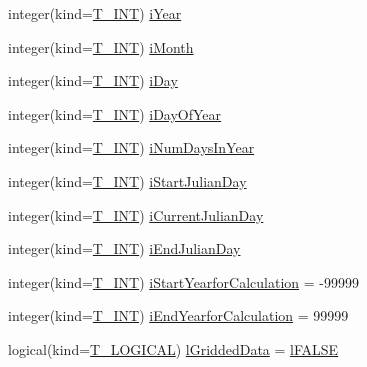 \begin{DoxyCompactItemize}
\item 
integer(kind=\hyperlink{namespacetest_a6f91ebd89b58cfcc5da99faed9385c1e}{T\_\-INT}) \hyperlink{typetest_1_1_t___m_o_d_e_l___c_o_n_f_i_g_u_r_a_t_i_o_n_a30420c6d7bb1e42891b2200260801f9c}{iYear}
\item 
integer(kind=\hyperlink{namespacetest_a6f91ebd89b58cfcc5da99faed9385c1e}{T\_\-INT}) \hyperlink{typetest_1_1_t___m_o_d_e_l___c_o_n_f_i_g_u_r_a_t_i_o_n_a22846dd71b4bccd8a1c00043437ac3f2}{iMonth}
\item 
integer(kind=\hyperlink{namespacetest_a6f91ebd89b58cfcc5da99faed9385c1e}{T\_\-INT}) \hyperlink{typetest_1_1_t___m_o_d_e_l___c_o_n_f_i_g_u_r_a_t_i_o_n_acbaa378dccabd89a4d13129e2c548146}{iDay}
\item 
integer(kind=\hyperlink{namespacetest_a6f91ebd89b58cfcc5da99faed9385c1e}{T\_\-INT}) \hyperlink{typetest_1_1_t___m_o_d_e_l___c_o_n_f_i_g_u_r_a_t_i_o_n_a4b04b0f7e7a10db7c8d28cea2b6e9848}{iDayOfYear}
\item 
integer(kind=\hyperlink{namespacetest_a6f91ebd89b58cfcc5da99faed9385c1e}{T\_\-INT}) \hyperlink{typetest_1_1_t___m_o_d_e_l___c_o_n_f_i_g_u_r_a_t_i_o_n_aab5b98a166cd8c8d894db495d6a58b16}{iNumDaysInYear}
\item 
integer(kind=\hyperlink{namespacetest_a6f91ebd89b58cfcc5da99faed9385c1e}{T\_\-INT}) \hyperlink{typetest_1_1_t___m_o_d_e_l___c_o_n_f_i_g_u_r_a_t_i_o_n_ae7c0e66b9ae35864c3ecaf8daf437d31}{iStartJulianDay}
\item 
integer(kind=\hyperlink{namespacetest_a6f91ebd89b58cfcc5da99faed9385c1e}{T\_\-INT}) \hyperlink{typetest_1_1_t___m_o_d_e_l___c_o_n_f_i_g_u_r_a_t_i_o_n_a0d100f6b26ab499a54097cca3828f266}{iCurrentJulianDay}
\item 
integer(kind=\hyperlink{namespacetest_a6f91ebd89b58cfcc5da99faed9385c1e}{T\_\-INT}) \hyperlink{typetest_1_1_t___m_o_d_e_l___c_o_n_f_i_g_u_r_a_t_i_o_n_a505c58e377653d1063a50f56fc081fff}{iEndJulianDay}
\item 
integer(kind=\hyperlink{namespacetest_a6f91ebd89b58cfcc5da99faed9385c1e}{T\_\-INT}) \hyperlink{typetest_1_1_t___m_o_d_e_l___c_o_n_f_i_g_u_r_a_t_i_o_n_ac4f0134042449fa35fc01ddc10403b57}{iStartYearforCalculation} = -\/99999
\item 
integer(kind=\hyperlink{namespacetest_a6f91ebd89b58cfcc5da99faed9385c1e}{T\_\-INT}) \hyperlink{typetest_1_1_t___m_o_d_e_l___c_o_n_f_i_g_u_r_a_t_i_o_n_ab0bc33153f6bf665d6444258b59340c6}{iEndYearforCalculation} = 99999
\item 
logical(kind=\hyperlink{namespacetest_acdeac586276a7d1d394fb5eddc77fc3d}{T\_\-LOGICAL}) \hyperlink{typetest_1_1_t___m_o_d_e_l___c_o_n_f_i_g_u_r_a_t_i_o_n_aac451f732bf0ba0322fd28dc2daad20d}{lGriddedData} = \hyperlink{namespacetest_ad44869e0204417021792170cd610ee25}{lFALSE}

\end{DoxyCompactItemize}
